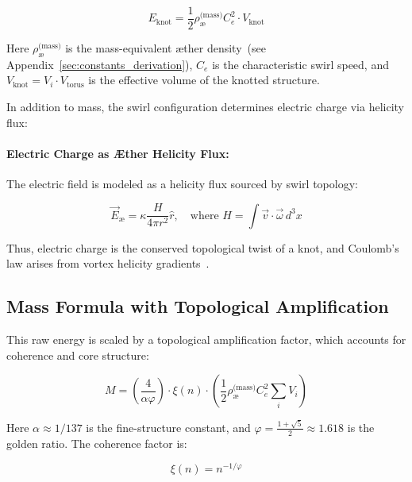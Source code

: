 \documentclass[preprint]{revtex4-2}
\begin{document}
    \begin{equation}
    E_{\text{knot}} = \frac{1}{2} \rho_{\text{\ae}}^{\text{(mass)}} C_e^2 \cdot V_{\text{knot}}
    \label{eq:raw_swirl_energy}
    \end{equation}

    Here \( \rho_{\text{\ae}}^{\text{(mass)}} \) is the mass-equivalent æther density~(see Appendix~\ref{sec:constants_derivation}), \( C_e \) is the characteristic swirl speed, and \( V_{\text{knot}} = V_i \cdot V_{\text{torus}} \) is the effective volume of the knotted structure.

    In addition to mass, the swirl configuration determines electric charge via helicity flux:

    \paragraph{Electric Charge as Æther Helicity Flux:}
    The electric field is modeled as a helicity flux sourced by swirl topology:

    \begin{equation}
        \vec{E}_{\text{\ae}} = \kappa \frac{H}{4\pi r^2} \hat{r}, \quad \text{where } H = \int \vec{v} \cdot \vec{\omega} \, d^3x
    \end{equation}

    Thus, electric charge is the conserved topological twist of a knot, and Coulomb’s law arises from vortex helicity gradients~\cite{ranada1992knots}.

    \subsection{Mass Formula with Topological Amplification}
    This raw energy is scaled by a topological amplification factor, which accounts for coherence and core structure:

    \begin{equation}
    M = \left( \frac{4}{\alpha \varphi} \right) \cdot \xi(n) \cdot \left( \frac{1}{2} \rho_{\text{\ae}}^{\text{(mass)}} C_e^2 \sum_i V_i \right)
    \label{eq:mass_formula_basic}
    \end{equation}

    Here \( \alpha \approx 1/137 \) is the fine-structure constant, and \( \varphi = \frac{1 + \sqrt{5}}{2} \approx 1.618 \) is the golden ratio. The coherence factor is:

    \begin{equation}
    \xi(n) = n^{-1/\varphi}
    \label{eq:coherence_factor}
    \end{equation}
\end{document}
